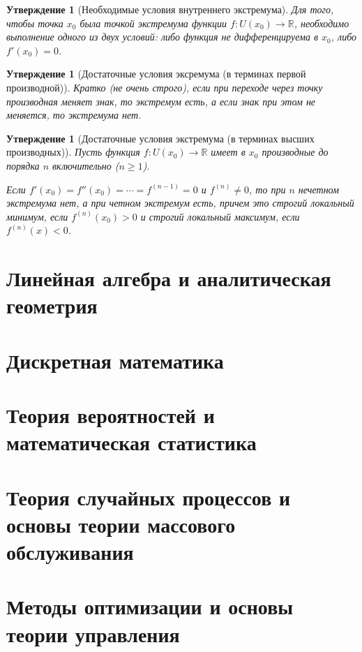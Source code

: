 \documentclass[12pt]{report}
\theoremstyle{plain}
\newtheorem{statement}[theorem]{Утверждение}
\newcommand{\R}{\mathbb R}
\begin{document}
\begin{statement}[Необходимые условия внутреннего экстремума]
Для того, чтобы точка $x_0$ была точкой экстремума функции
$f: U(x_0) \rightarrow \R$, необходимо выполнение одного из двух условий:
либо функция не дифференцируема в $x_0$, либо $f'(x_0) = 0$.
\end{statement}

\begin{statement}[Достаточные условия эксремума (в терминах первой производной)]
Кратко (не очень строго), если при переходе через точку производная меняет знак,
то экстремум есть, а если знак при этом не меняется, то экстремума нет.
\end{statement}

\begin{statement}[Достаточные условия экстремума (в терминах высших производных)]
Пусть функция $f: U(x_0) \rightarrow \R$ имеет в $x_0$ производные до порядка $n$
включительно ($n \ge 1$).

Если $f'(x_0) = f''(x_0) = \cdots = f^{(n-1)} = 0$ и $f^{(n)} \ne 0$, то при
$n$ нечетном экстремума нет, а при четном экстремум есть, причем это строгий
локальный минимум, если $f^{(n)}(x_0) > 0$ и строгий локальный максимум,
если $f^{(n)}(x) < 0$.
\end{statement}


\chapter{Линейная алгебра и аналитическая геометрия}

\chapter{Дискретная математика}

\chapter{Теория вероятностей и математическая статистика}

\chapter{Теория случайных процессов и основы теории массового обслуживания}

\chapter{Методы оптимизации и основы теории управления}
\end{document}
